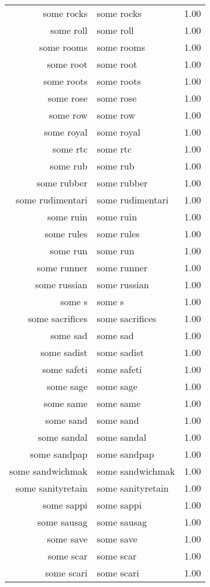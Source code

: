 \begin{table}[ht]
\begin{tabular}{rlr}
  some rocks & some rocks & 1.00 \\ 
  some roll & some roll & 1.00 \\ 
  some rooms & some rooms & 1.00 \\ 
  some root & some root & 1.00 \\ 
  some roots & some roots & 1.00 \\ 
  some rose & some rose & 1.00 \\ 
  some row & some row & 1.00 \\ 
  some royal & some royal & 1.00 \\ 
  some rtc & some rtc & 1.00 \\ 
  some rub & some rub & 1.00 \\ 
  some rubber & some rubber & 1.00 \\ 
  some rudimentari & some rudimentari & 1.00 \\ 
  some ruin & some ruin & 1.00 \\ 
  some rules & some rules & 1.00 \\ 
  some run & some run & 1.00 \\ 
  some runner & some runner & 1.00 \\ 
  some russian & some russian & 1.00 \\ 
  some s & some s & 1.00 \\ 
  some sacrifices & some sacrifices & 1.00 \\ 
  some sad & some sad & 1.00 \\ 
  some sadist & some sadist & 1.00 \\ 
  some safeti & some safeti & 1.00 \\ 
  some sage & some sage & 1.00 \\ 
  some same & some same & 1.00 \\ 
  some sand & some sand & 1.00 \\ 
  some sandal & some sandal & 1.00 \\ 
  some sandpap & some sandpap & 1.00 \\ 
  some sandwichmak & some sandwichmak & 1.00 \\ 
  some sanityretain & some sanityretain & 1.00 \\ 
  some sappi & some sappi & 1.00 \\ 
  some sausag & some sausag & 1.00 \\ 
  some save & some save & 1.00 \\ 
  some scar & some scar & 1.00 \\ 
  some scari & some scari & 1.00 \\ 

\end{tabular}
\end{table}
